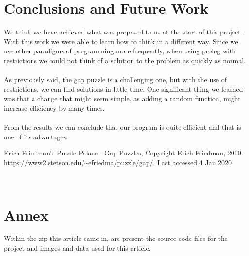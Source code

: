 \documentclass[runningheads]{llncs}
\begin{document}
\pagebreak
\section{Conclusions and Future Work}
\paragraph{}
We think we have achieved what was proposed to us at the start of this project. With this work we were able to learn how to think in a different way.
Since we use other paradigms of programming more frequently, when using prolog with restrictions we could not think of a solution to the problem as quickly as normal.
\paragraph{}
As previously said, the gap puzzle is a challenging one, but with the use of restrictions, we can find solutions in little time.
One significant thing we learned was that a change that might seem simple, as adding a random function, might increase efficiency by many times.
\paragraph{}
From the results we can conclude that our program is quite efficient and that is one of its advantages.

\begin{thebibliography}{8}
    Erich Friedman's Puzzle Palace - Gap Puzzles, Copyright Erich Friedman, 2010.
    \url{https://www2.stetson.edu/~efriedma/puzzle/gap/}.
    Last accessed 4 Jan 2020
\end{thebibliography}

\appendix
\section{\\Annex}
\paragraph{}
Within the zip this article came in, are present the source code files for the project and images and data used for this article.
\end{document}
